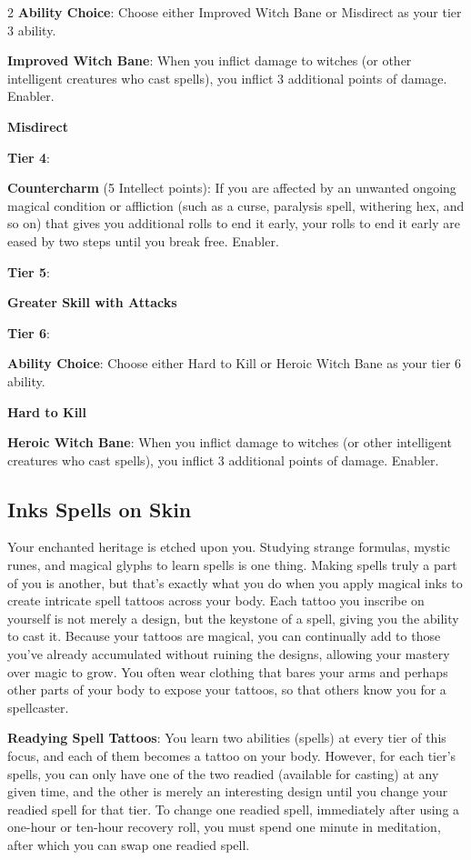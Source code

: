 \begin{multicols}{2}
\textbf{Ability Choice}: Choose either Improved Witch Bane or Misdirect as your tier 3 ability.

\textbf{Improved Witch Bane}: When you inflict damage to witches (or other intelligent creatures who cast spells), you inflict 3 additional points of damage. Enabler.

\textbf{Misdirect}

\textbf{Tier 4}:

\textbf{Countercharm} (5 Intellect points): If you are affected by an unwanted ongoing magical condition or affliction (such as a curse, paralysis spell, withering hex, and so on) that gives you additional rolls to end it early, your rolls to end it early are eased by two steps until you break free. Enabler.

\textbf{Tier 5}: 

\textbf{Greater Skill with Attacks}

\textbf{Tier 6}:

\textbf{Ability Choice}: Choose either Hard to Kill or Heroic Witch Bane as your tier 6 ability.

\textbf{Hard to Kill}
 
\textbf{Heroic Witch Bane}: When you inflict damage to witches (or other intelligent creatures who cast spells), you inflict 3 additional points of damage. Enabler.

\subsection{Inks Spells on Skin}

Your enchanted heritage is etched upon you. Studying strange formulas, mystic runes, and magical glyphs to learn spells is one thing. Making spells truly a part of you is another, but that’s exactly what you do when you apply magical inks to create intricate spell tattoos across your body. Each tattoo you inscribe on yourself is not merely a design, but the keystone of a spell, giving you the ability to cast it. Because your tattoos are magical, you can continually add to those you’ve already accumulated without ruining the designs, allowing your mastery over magic to grow. You often wear clothing that bares your arms and perhaps other parts of your body to expose your tattoos, so that others know you for a spellcaster.

\textbf{Readying Spell Tattoos}: You learn two abilities (spells) at every tier of this focus, and each of them becomes a tattoo on your body. However, for each tier’s spells, you can only have one of the two readied (available for casting) at any given time, and the other is merely an interesting design until you change your readied spell for that tier. To change one readied spell, immediately after using a one-hour or ten-hour recovery roll, you must spend one minute in meditation, after which you can swap one readied spell.


\end{multicols}
